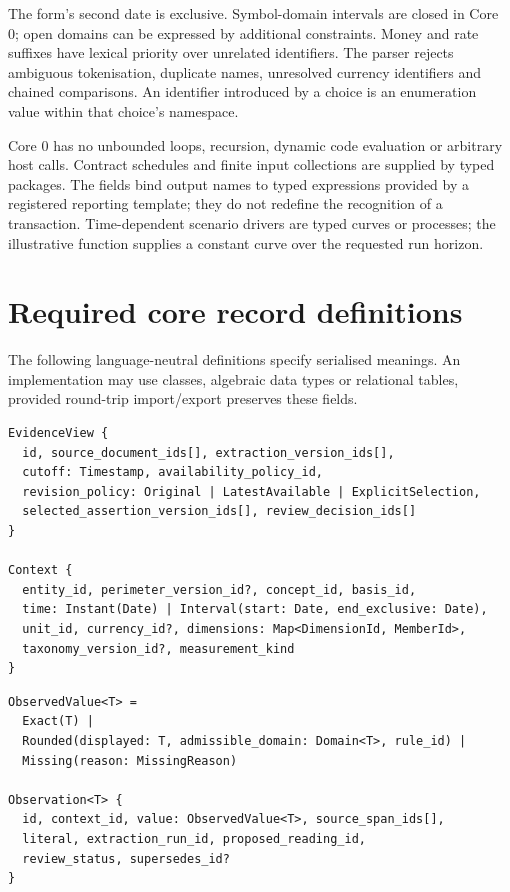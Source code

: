 The  form's second date is exclusive. Symbol-domain intervals
are closed in Core 0; open domains can be expressed by additional constraints.
Money and rate suffixes have lexical priority over unrelated identifiers.
The parser rejects ambiguous tokenisation, duplicate names, unresolved currency
identifiers and chained comparisons. An identifier introduced by a choice is
an enumeration value within that choice's namespace.

Core 0 has no unbounded loops, recursion, dynamic code evaluation or arbitrary
host calls. Contract schedules and finite input collections are supplied by
typed packages. The  fields bind output names to typed expressions
provided by a registered reporting template; they do not redefine the
recognition of a transaction. Time-dependent scenario drivers are typed curves
or processes; the illustrative  function supplies a constant
curve over the requested run horizon.

\section{Required core record definitions}

The following language-neutral definitions specify serialised meanings.
An implementation may use classes, algebraic data types or relational tables,
provided round-trip import/export preserves these fields.

\begin{minipage}{\linewidth}
\begin{lstlisting}
EvidenceView {
  id, source_document_ids[], extraction_version_ids[],
  cutoff: Timestamp, availability_policy_id,
  revision_policy: Original | LatestAvailable | ExplicitSelection,
  selected_assertion_version_ids[], review_decision_ids[]
}

Context {
  entity_id, perimeter_version_id?, concept_id, basis_id,
  time: Instant(Date) | Interval(start: Date, end_exclusive: Date),
  unit_id, currency_id?, dimensions: Map<DimensionId, MemberId>,
  taxonomy_version_id?, measurement_kind
}
\end{lstlisting}
\end{minipage}

\begin{minipage}{\linewidth}
\begin{lstlisting}
ObservedValue<T> =
  Exact(T) |
  Rounded(displayed: T, admissible_domain: Domain<T>, rule_id) |
  Missing(reason: MissingReason)

Observation<T> {
  id, context_id, value: ObservedValue<T>, source_span_ids[],
  literal, extraction_run_id, proposed_reading_id,
  review_status, supersedes_id?
}
\end{lstlisting}
\end{minipage}

